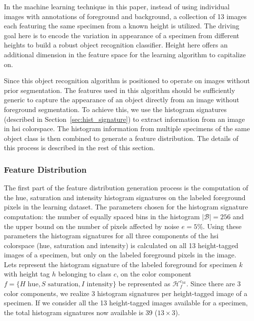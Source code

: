 \documentclass {udthesis}
\begin{document}
In the machine learning technique in this paper, instead of using individual images with annotations of foreground and background, a collection of 13 images each featuring the same specimen from a known height is utilized. The driving goal here is to encode the variation in appearance of a specimen from different heights to build a robust object recognition classifier. Height here offers an additional dimension in the feature space for the learning algorithm to capitalize on.

Since this object recognition algorithm is positioned to operate on images without prior segmentation. The features used in this algorithm should be sufficiently generic to capture the appearance of an object directly from an image without foreground segmentation. To achieve this, we use the histogram signatures (described in Section~\ref{sec:hist_signature}) to extract information from an image in \gls{hsi} colorspace. The histogram information from multiple specimens of the same object class is then combined to generate a feature distribution. The details of this process is described in the rest of this section.

\subsubsection{Feature Distribution}
\label{sec:distdes_feature_distr}

The first part of the feature distribution generation process is the computation of the hue, saturation and intensity histogram signatures on the labeled foreground pixels in the learning dataset. The parameters chosen for the histogram signature computation: the number of equally spaced bins in the histogram $|\mathcal{B}|=256$ and the upper bound on the number of pixels affected by noise $e=5\%$. Using these parameters the histogram signatures for all three components of the \gls{hsi} colorspace (hue, saturation and intensity) is calculated on all 13 height-tagged images of a specimen, but only on the labeled foreground pixels in the image. Lets represent the histogram signature of the labeled foreground for specimen $k$ with height tag $h$ belonging to class $c$, on the color component $f=\{H \text{ hue}, S \text{ saturation}, I \text{ intensity}\}$ be represented as $\mathcal{H}^{c_{hk}}_f$. Since there are 3 color components, we realize 3 histogram signatures per height-tagged image of a specimen. If we 
consider all the 13 height-tagged images available for a specimen, the total histogram signatures now available is 39 ($13 \times 3$).
\end{document}

